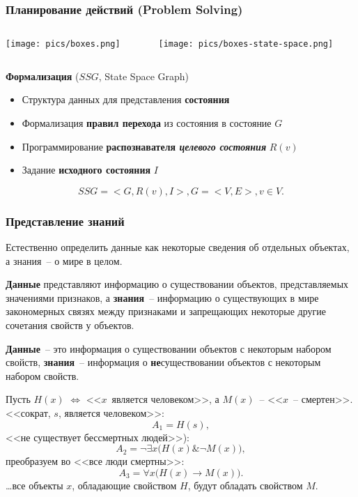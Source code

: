 \documentclass[10pt]{beamer}
\begin{document}
\begin{frame}
  \frametitle{Планирование действий (Problem Solving)}

\begin{columns}
  \begin{column}{0.4\textwidth}
    \texttt{[image: pics/boxes.png]}
  \end{column}
  \begin{column}{0.4\textwidth}
    \texttt{[image: pics/boxes-state-space.png]}
  \end{column}
\end{columns}
\vfill
\textbf{Формализация} ($SSG$, State Space Graph)
\begin{itemize}
\item Структура данных для представления \textbf{состояния}
\item Формализация \textbf{правил перехода} из состояния в состояние $G$
\item Программирование \textbf{распознавателя \emph{целевого состояния}} $R(v)$
\item Задание \textbf{исходного состояния} $I$
\end{itemize}
\vspace{1em}
\[
  SSG = <G, R(v), I>, G=<V,E>, v\in V.
\]
\end{frame}


\begin{frame}[fragile]
  \frametitle{Представление знаний}
\small
Естественно определить данные как некоторые сведения об отдельных объектах, а знания~-- о мире в целом.

{\bf Данные} представляют информацию о существовании объектов, представляемых значениями признаков, а {\bf знания}~-- информацию о существующих в мире закономерных связях между признаками и запрещающих некоторые другие сочетания свойств у объектов.

{\bf Данные}~-- это информация о существовании объектов с некоторым набором свойств, {\bf знания}~-- информация о \textbf{не}существовании объектов с некоторым набором свойств.

Пусть $H(x)$ $\Leftrightarrow$ <<$x$~является человеком>>, а $M(x)$~-- <<$x$~-- смертен>>. \\

\noindent{}<<сократ, $s$, является человеком>>:
$$
    A_1=H(s),
$$
<<не существует бессмертных людей>>):
$$
    A_2=\neg\exists x \big ( H(x) \& \neg M(x) \big ),
$$
преобразуем во <<все люди смертны>>:
$$
    A_3=\forall x \big ( H(x)\to M(x)\big ).
$$
\ldots все объекты $x$, обладающие свойством $H$, будут обладать свойством $M$.

\end{frame}
\end{document}
